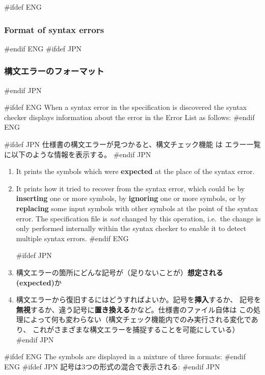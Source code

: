 \documentclass[\pformat,12pt]{article}
\newcommand{\guicmd}[1]{{\sf #1}}
\newcommand{\guicmd}[1]{{\gt #1}}
\begin{document}
#ifdef ENG
\subsubsection{Format of syntax errors} \label{subsub:synerr}
#endif ENG
#ifdef JPN
\subsubsection{構文エラーのフォーマット} \label{subsub:synerr}
#endif JPN

#ifdef ENG
When a syntax error in the specification is discovered the syntax
checker displays information about the
error in the \guicmd{Error List} as follows:
#endif ENG

#ifdef JPN
仕様書の構文エラーが見つかると、構文チェック機能 は
\guicmd{エラー一覧}に以下のような情報を表示する。
#endif JPN

\begin{enumerate}

#ifdef ENG
\item It prints the symbols which were \textbf{expected} at the place
  of the syntax error.

\item It prints how it tried to recover from the syntax error, which
  could be by \textbf{inserting} one or more symbols, by
  \textbf{ignoring} one or more symbols, or by \textbf{replacing} 
  some input symbols with other symbols at the point of the syntax
  error. The specification file is {\em not\/} changed by this
  operation, i.e.\ the change is only performed internally within the
  syntax checker to enable it to detect multiple syntax errors.
#endif ENG

#ifdef JPN
\item
 構文エラーの箇所にどんな記号が（足りないことが）\textbf{想定される(expected)}か

\item
  構文エラーから復旧するにはどうすればよいか。記号を\textbf{挿入}するか、
  記号を\textbf{無視}するか、違う記号に\textbf{置き換える}かなど。仕様書のファイル自体は
  この処理によって何も変わらない（構文チェック機能内でのみ実行される変化であり、
  これがさまざまな構文エラーを捕捉することを可能にしている）
#endif JPN

\end{enumerate}

#ifdef ENG
The symbols are displayed in a mixture of three formats:
#endif ENG
#ifdef JPN
記号は3つの形式の混合で表示される:
#endif JPN
\end{document}
